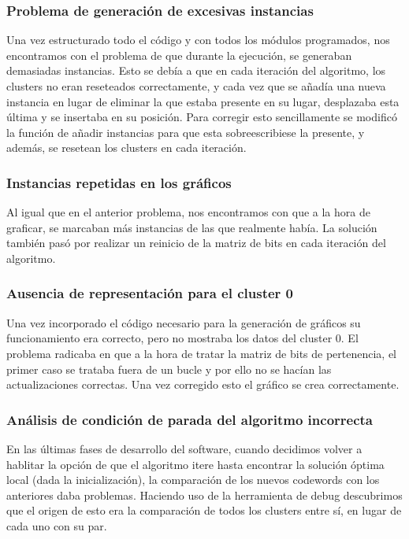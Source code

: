 \documentclass[10pt,a4paper]{article}
\begin{document}
\subsubsection{Problema de generación de excesivas instancias}
Una vez estructurado todo el código y con todos los módulos programados, nos encontramos con el problema de que durante la ejecución, 
se generaban demasiadas instancias. Esto se debía a que en cada iteración del algoritmo, los clusters no eran reseteados correctamente, y cada vez que se añadía 
una nueva instancia en lugar de eliminar la que estaba presente en su lugar, desplazaba esta última y se insertaba en su posición. Para corregir esto sencillamente
se modificó la función de añadir instancias para que esta sobreescribiese la presente, y además, se resetean los clusters en cada iteración.

\subsubsection{Instancias repetidas en los gráficos}
Al igual que en el anterior problema, nos encontramos con que a la hora de graficar, se marcaban más instancias de las que realmente había. La solución también pasó por 
realizar un reinicio de la matriz de bits en cada iteración del algoritmo.

\subsubsection{Ausencia de representación para el cluster 0}
Una vez incorporado el código necesario para la generación de gráficos su funcionamiento era correcto, pero no mostraba los datos del cluster 0. El problema radicaba
 en que a la hora de tratar la matriz de bits de pertenencia, el primer caso se trataba fuera de un bucle y por ello no se hacían las actualizaciones correctas. Una 
 vez corregido esto el gráfico se crea correctamente.

\subsubsection{Análisis de condición de parada del algoritmo incorrecta}
En las últimas fases de desarrollo del software, cuando decidimos volver a
hablitar la opción de que el algoritmo itere hasta encontrar la solución óptima
local (dada la inicialización), la comparación de los nuevos codewords con los
anteriores daba problemas. Haciendo uso de la herramienta de debug descubrimos
que el origen de esto era la comparación de todos los clusters entre sí, en
lugar de cada uno con su par.
\end{document}
